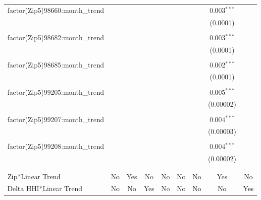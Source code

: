 \begin{table}[H]
{\begin{tabular}{@{\extracolsep{5pt}}lcccccccc}
  factor(Zip5)98660:month\_trend &  &  &  &  &  &  & 0.003$^{***}$ &  \\  

   &  &  &  &  &  &  & (0.0001) &  \\  

   & & & & & & & & \\  

  factor(Zip5)98682:month\_trend &  &  &  &  &  &  & 0.003$^{***}$ &  \\  

   &  &  &  &  &  &  & (0.0001) &  \\  

   & & & & & & & & \\  

  factor(Zip5)98685:month\_trend &  &  &  &  &  &  & 0.002$^{***}$ &  \\  

   &  &  &  &  &  &  & (0.0001) &  \\  

   & & & & & & & & \\  

  factor(Zip5)99205:month\_trend &  &  &  &  &  &  & 0.005$^{***}$ &  \\  

   &  &  &  &  &  &  & (0.00002) &  \\  

   & & & & & & & & \\  

  factor(Zip5)99207:month\_trend &  &  &  &  &  &  & 0.004$^{***}$ &  \\  

   &  &  &  &  &  &  & (0.00003) &  \\  

   & & & & & & & & \\  

  factor(Zip5)99208:month\_trend &  &  &  &  &  &  & 0.004$^{***}$ &  \\  

   &  &  &  &  &  &  & (0.00002) &  \\  

   & & & & & & & & \\  

 \hline \\[-1.8ex]  

 Zip*Linear Trend & No & Yes & No & No & No & No & Yes & No \\  

 Delta HHI*Linear Trend & No & No & Yes & No & No & No & No & Yes \\  


\end{tabular}}
\end{table}
